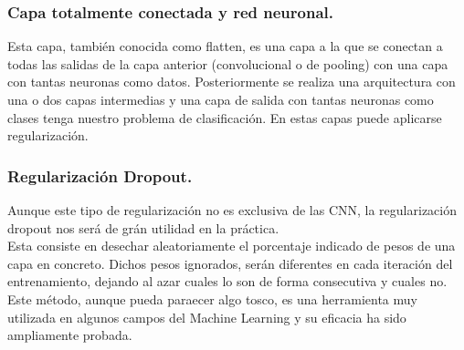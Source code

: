 \documentclass[a4paper,10pt]{article}
\begin{document}
\subsubsection{Capa totalmente conectada y red neuronal.}
Esta capa, también conocida como flatten, es una capa a la que se conectan a todas las salidas de la capa anterior (convolucional o de pooling) con una capa con tantas neuronas como datos. Posteriormente se realiza una arquitectura con una o dos capas intermedias y una capa de salida con tantas neuronas como clases tenga nuestro problema de clasificación. En estas capas puede aplicarse regularización.
\subsubsection{Regularización Dropout.}
Aunque este tipo de regularización no es exclusiva de las CNN, la regularización dropout nos será de grán utilidad en la práctica. \\Esta consiste en desechar aleatoriamente el porcentaje indicado de pesos de una capa en concreto. Dichos pesos ignorados, serán diferentes en cada iteración del entrenamiento, dejando al azar cuales lo son de forma consecutiva y cuales no.\\ Este método, aunque pueda paraecer algo tosco, es una herramienta muy utilizada en algunos campos del Machine Learning y su eficacia ha sido ampliamente probada.
\end{document}
